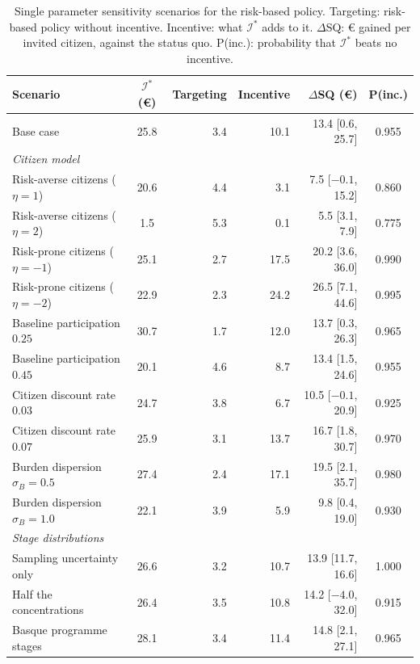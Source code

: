 \documentclass[12pt]{article}
\begin{document}
\begin{table}[h!]
\centering
\footnotesize
\caption{Single parameter sensitivity scenarios for the risk-based policy. Targeting: risk-based policy without incentive. Incentive: what $\mathcal{I}^*$ adds to it. $\Delta$SQ: € gained per invited citizen, against the status quo. P(inc.): probability that $\mathcal{I}^*$ beats no incentive.}
\label{tab:sensitivity}
\begin{tabular}{l c r r r c}
\toprule
\textbf{Scenario} & $\mathcal{I}^*$ (€) & \textbf{Targeting} & \textbf{Incentive} & \textbf{$\Delta$SQ (€)} & \textbf{P(inc.)} \\
\midrule
Base case                          & 25.8 & 3.4 & 10.1 & 13.4 [0.6, 25.7]     & 0.955 \\
\midrule
\multicolumn{6}{l}{\emph{Citizen model}} \\
Risk-averse citizens ($\eta = 1$)  & 20.6 & 4.4 &  3.1 &  7.5 [$-0.1$, 15.2]  & 0.860 \\
Risk-averse citizens ($\eta = 2$)  &  1.5 & 5.3 &  0.1 &  5.5 [3.1, 7.9]      & 0.775 \\
Risk-prone citizens ($\eta = -1$)  & 25.1 & 2.7 & 17.5 & 20.2 [3.6, 36.0]     & 0.990 \\
Risk-prone citizens ($\eta = -2$)  & 22.9 & 2.3 & 24.2 & 26.5 [7.1, 44.6]     & 0.995 \\
Baseline participation $0.25$      & 30.7 & 1.7 & 12.0 & 13.7 [0.3, 26.3]     & 0.965 \\
Baseline participation $0.45$      & 20.1 & 4.6 &  8.7 & 13.4 [1.5, 24.6]     & 0.955 \\
Citizen discount rate $0.03$       & 24.7 & 3.8 &  6.7 & 10.5 [$-0.1$, 20.9]  & 0.925 \\
Citizen discount rate $0.07$       & 25.9 & 3.1 & 13.7 & 16.7 [1.8, 30.7]     & 0.970 \\
Burden dispersion $\sigma_B = 0.5$ & 27.4 & 2.4 & 17.1 & 19.5 [2.1, 35.7]     & 0.980 \\
Burden dispersion $\sigma_B = 1.0$ & 22.1 & 3.9 &  5.9 &  9.8 [0.4, 19.0]     & 0.930 \\
\midrule
\multicolumn{6}{l}{\emph{Stage distributions}} \\
Sampling uncertainty only          & 26.6 & 3.2 & 10.7 & 13.9 [11.7, 16.6]    & 1.000 \\
Half the concentrations            & 26.4 & 3.5 & 10.8 & 14.2 [$-4.0$, 32.0]  & 0.915 \\
Basque programme stages     & 28.1 & 3.4 & 11.4 & 14.8 [2.1, 27.1]     & 0.965 \\

\end{tabular}
\end{table}
\end{document}
